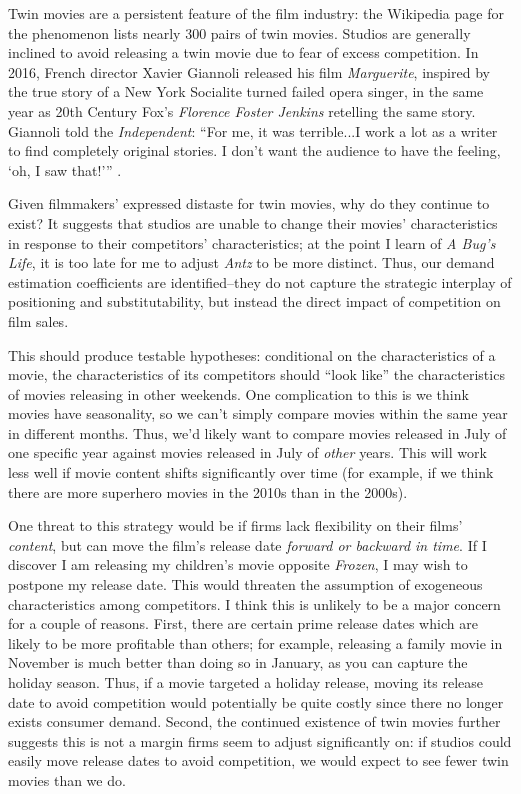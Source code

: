 \documentclass{article}
\begin{document}
Twin movies are a persistent feature of the film industry: the Wikipedia page for the phenomenon lists nearly 300 pairs of twin movies. Studios are generally inclined to avoid releasing a twin movie due to fear of excess competition. In 2016, French director Xavier Giannoli released his film \emph{Marguerite}, inspired by the true story of a New York Socialite turned failed opera singer, in the same year as 20th Century Fox's \emph{Florence Foster Jenkins} retelling the same story. Giannoli told the \emph{Independent}: ``For me, it was terrible...I work a lot as a writer to find completely original stories. I don't want the audience to have the feeling, `oh, I saw that!''' \parencite{mottram2016I}.

Given filmmakers' expressed distaste for twin movies, why do they continue to exist? It suggests that studios are unable to change their movies' characteristics in response to their competitors' characteristics; at the point I learn of \emph{A Bug's Life}, it is too late for me to adjust \emph{Antz} to be more distinct. Thus, our demand estimation coefficients are identified--they do not capture the strategic interplay of positioning and substitutability, but instead the direct impact of competition on film sales.

This should produce testable hypotheses: conditional on the characteristics of a movie, the characteristics of its competitors should ``look like'' the characteristics of movies releasing in other weekends. One complication to this is we think movies have seasonality, so we can't simply compare movies within the same year in different months. Thus, we'd likely want to compare movies released in July of one specific year against movies released in July of \emph{other} years. This will work less well if movie content shifts significantly over time (for example, if we think there are more superhero movies in the 2010s than in the 2000s). 

One threat to this strategy would be if firms lack flexibility on their films' \emph{content}, but can move the film's release date \emph{forward or backward in time}. If I discover I am releasing my children's movie opposite \emph{Frozen}, I may wish to postpone my release date. This would threaten the assumption of exogeneous characteristics among competitors. I think this is unlikely to be a major concern for a couple of reasons. First, there are certain prime release dates which are likely to be more profitable than others; for example, releasing a family movie in November is much better than doing so in January, as you can capture the holiday season. Thus, if a movie targeted a holiday release, moving its release date to avoid competition would potentially be quite costly since there no longer exists consumer demand. Second, the continued existence of twin movies further suggests this is not a margin firms seem to adjust significantly on: if studios could easily move release dates to avoid competition, we would expect to see fewer twin movies than we do. 
\end{document}
